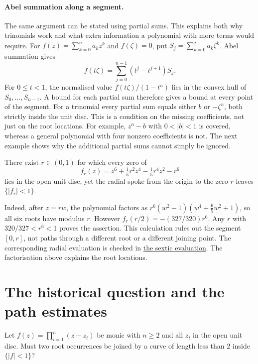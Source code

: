 \documentclass[11pt]{article}
\begin{document}
\paragraph{Abel summation along a segment.}
The same argument can be stated using partial sums. This explains both
why trinomials work and what extra information a polynomial with more
terms would require.
For $f(z)=\sum_{k=0}^n a_kz^k$ and $f(\zeta)=0$, put
$S_j=\sum_{k=0}^j a_k\zeta^k$.  Abel summation gives
\[
 f(t\zeta)=\sum_{j=0}^{n-1}(t^j-t^{j+1})S_j.
\]
For $0\le t<1$, the normalised value $f(t\zeta)/(1-t^n)$ lies in the convex
hull of $S_0,\ldots,S_{n-1}$.  A bound for each partial sum therefore gives a bound at every point of the segment.  For a trinomial every partial sum equals either $b$ or $-\zeta^n$, both strictly inside the unit disc.  This is a condition on the missing coefficients, not just on the root locations.
For example, $z^n-b$ with $0<|b|<1$ is covered, whereas a general polynomial
with four nonzero coefficients is not. The next example shows why the
additional partial sums cannot simply be ignored.

\begin{proposition}
\label{res:sextic-spoke}
There exist $r\in(0,1)$ for which every zero of
\[
 f_r(z)=z^6+\tfrac15 r^2 z^4-\tfrac15 r^4 z^2-r^6
\]
lies in the open unit disc, yet the radial spoke from the origin to the zero
$r$ leaves $\{|f_r|<1\}$.
\end{proposition}

Indeed, after $z=rw$, the polynomial factors as
$r^6(w^2-1)(w^4+\tfrac65 w^2+1)$, so all six roots have modulus $r$.
However $f_r(r/2)=-(327/320)r^6$.  Any $r$ with $320/327<r^6<1$ proves the
assertion.  This calculation rules out the segment $[0,r]$, not paths through a
different root or a different joining point.  The corresponding radial evaluation is checked in
\href{https://github.com/wcook04/plectis-erdos/blob/0ba585f632fbbbb43af2ee9532d4e83752af3f67/ErdosProblems/Erdos1041/AbelControlPolygon.lean#L555}{the sextic evaluation}.
The factorisation above explains the root locations.

\section{The historical question and the path estimates}\label{sec:problem}

\begin{problem}[Erd\H{o}s \#1041]\label{res:problem}
Let $f(z)=\prod_{i=1}^{n}(z-z_i)$ be monic with $n\ge2$ and all
$z_i$ in the open unit disc.  Must two root occurrences be joined by a curve
of length less than $2$ inside $\{|f|<1\}$?
\end{problem}
\end{document}
